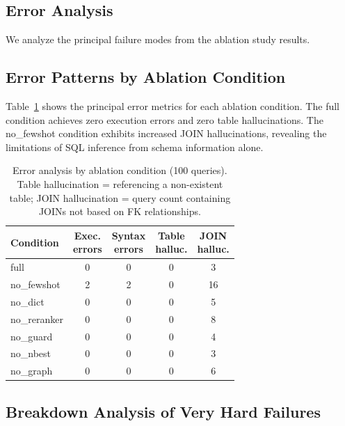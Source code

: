 \documentclass[sn-mathphys,Numbered]{sn-jnl}
\begin{document}
\begin{CJK}{UTF8}{min}
\section{Error Analysis}
\label{sec:error_analysis}

We analyze the principal failure modes from the ablation study results.

\subsection{Error Patterns by Ablation Condition}

Table~\ref{tab:error_analysis} shows the principal error metrics
for each ablation condition.
The full condition achieves zero execution errors and zero table
hallucinations.
The no\_fewshot condition exhibits increased JOIN hallucinations,
revealing the limitations of SQL inference from schema information
alone.

\begin{table}[t]
  \centering
  \caption{Error analysis by ablation condition (100 queries).
  Table hallucination = referencing a non-existent table;
  JOIN hallucination = query count containing JOINs not based
  on FK relationships.}
  \label{tab:error_analysis}
  \small
  \begin{tabular}{lcccc}
    \toprule
    Condition & \shortstack{Exec.\\errors} & \shortstack{Syntax\\errors} & \shortstack{Table\\halluc.} & \shortstack{JOIN\\halluc.} \\
    \midrule
    full          & 0 & 0 & 0 & 3 \\
    no\_fewshot   & 2 & 2 & 0 & 16 \\
    no\_dict      & 0 & 0 & 0 & 5 \\
    no\_reranker  & 0 & 0 & 0 & 8 \\
    no\_guard     & 0 & 0 & 0 & 4 \\
    no\_nbest     & 0 & 0 & 0 & 3 \\
    no\_graph     & 0 & 0 & 0 & 6 \\
    \bottomrule
  \end{tabular}
\end{table}

\subsection{Breakdown Analysis of Very Hard Failures}


\end{CJK}
\end{document}
